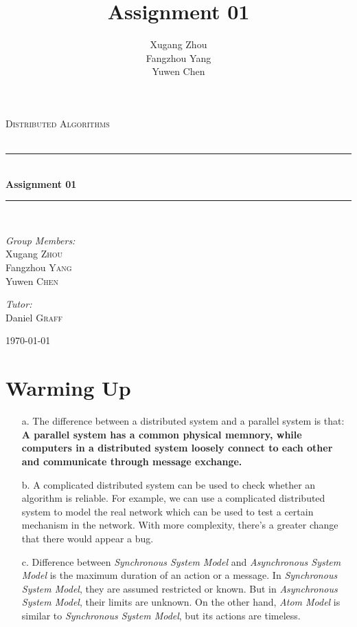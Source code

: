 \documentclass[a4paper, 14pt]{article}
\title{\bf Assignment 01}
\author{Xugang Zhou \\ Fangzhou Yang \\ Yuwen Chen}
\newcommand{\HRule}{\rule{\linewidth}{0.5mm}}
\begin{document}
\begin{titlepage}
\begin{center}
\vfill
\textsc{\LARGE Distributed Algorithms}\\[1.5cm]
\textsc{\Large }\\[0.5cm]

\HRule \\[0.4cm]
{\huge \bfseries Assignment 01}\\[0.4cm]
\HRule \\[1.5cm]
\begin{minipage}{0.4\textwidth}
\begin{flushleft} \large
\emph{Group Members:}\\
Xugang \textsc{Zhou}\\
Fangzhou \textsc{Yang}\\
Yuwen \textsc{Chen}
\end{flushleft}
\end{minipage}
\begin{minipage}{0.4\textwidth}
\begin{flushright} \large
\emph{Tutor:} \\
Daniel \textsc{Graff}\\
\end{flushright}
\end{minipage}
\vfill
{\large \today}\\
\end{center}
\end{titlepage}
\thispagestyle{fancy}
\section{Warming Up}
\begin{itemize}
\item[a.] The difference between a distributed system and a parallel
  system is that: {\bf A parallel system has a common physical memnory,
  while computers in a distributed system loosely connect to each
  other and communicate through message exchange.}
\item[b.] A complicated distributed system can be used to check
  whether an algorithm is reliable. For example, we can use
  a complicated distributed system to model the real network which can
  be used to test a certain mechanism in the network. With more
  complexity, there's a greater change that there would appear a bug.
\item[c.] Difference between {\it Synchronous System Model} and {\it
    Asynchronous System Model} is the maximum duration of an action or
  a message. In {\it Synchronous System Model}, they are assumed
  restricted or known. But in {\it Asynchronous System Model}, their
  limits are unknown.
On the other hand, {\it Atom Model} is similar to {\it Synchronous
  System Model}, but its actions are timeless.
\end{itemize}
\end{document}
